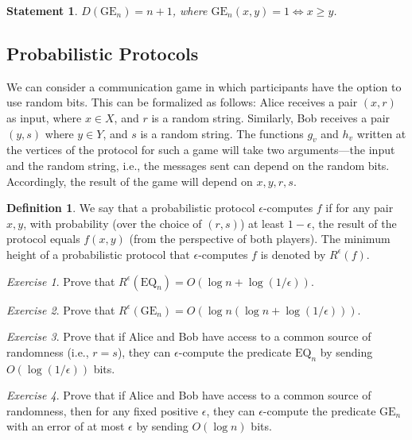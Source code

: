\documentclass[12pt,sans]{article}
\theoremstyle{definition}
\newtheorem{definition}{Definition}[section]
\theoremstyle{plain}
\newtheorem{statement}{Statement}[section]
\theoremstyle{remark}
\newtheorem{exercise}{Exercise}[section]
\begin{document}
\begin{statement}
    $D(\mathrm{GE}_n) = n + 1$, where $\mathrm{GE}_n(x,y) = 1 \iff x \ge y$.
\end{statement}

\subsection{Probabilistic Protocols}
We can consider a communication game in which participants have the option to use random bits. This can be formalized as follows: Alice receives a pair $(x,r)$ as input, where $x \in X$, and $r$ is a random string. Similarly, Bob receives a pair $(y,s)$ where $y \in Y$, and $s$ is a random string. The functions $g_v$ and $h_v$ written at the vertices of the protocol for such a game will take two arguments—the input and the random string, i.e., the messages sent can depend on the random bits. Accordingly, the result of the game will depend on $x,y,r,s$.

\begin{definition}
    We say that a probabilistic protocol $\epsilon$-computes $f$ if for any pair $x,y$, with probability (over the choice of $(r,s)$) at least $1 - \epsilon$, the result of the protocol equals $f(x,y)$ (from the perspective of both players). The minimum height of a probabilistic protocol that $\epsilon$-computes $f$ is denoted by $R^\epsilon(f)$.
\end{definition}

\begin{exercise}
    Prove that $R^\epsilon(\mathrm{EQ}_n) = O(\log n + \log(1/\epsilon))$.
\end{exercise}

\begin{exercise}
    Prove that $R^\epsilon(\mathrm{GE}_n) = O(\log n(\log n + \log(1/\epsilon)))$.
\end{exercise}

\begin{exercise}
    Prove that if Alice and Bob have access to a common source of randomness (i.e., $r = s$), they can $\epsilon$-compute the predicate $\mathrm{EQ}_n$ by sending $O(\log(1/\epsilon))$ bits.
\end{exercise}

\begin{exercise}
    Prove that if Alice and Bob have access to a common source of randomness, then for any fixed positive $\epsilon$, they can $\epsilon$-compute the predicate $\mathrm{GE}_n$ with an error of at most $\epsilon$ by sending $O(\log n)$ bits.
\end{exercise}
\end{document}

